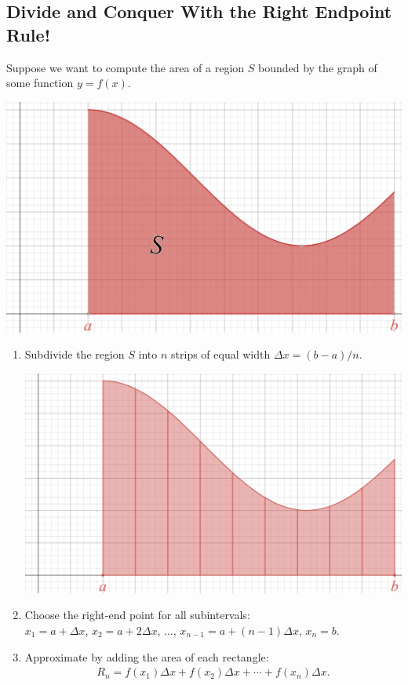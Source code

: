 \documentclass[12pt,a4paper]{article}
\begin{document}
	\newpage
	
	\subsection{Divide and Conquer With the Right Endpoint Rule!}
	
	Suppose we want to compute the area of a region $S$ bounded by the graph of some function $y = f(x)$.
	
	\begin{center}
	\includegraphics[scale=0.39]{regionS.png}
	\end{center}
	
	\begin{enumerate}[label=\underline{\textsc{Step} \Roman*}]
	\item Subdivide the region $S$ into $n$ strips of equal width $\Delta x = (b-a)/n$.
		\begin{center}
		\includegraphics[scale=0.365]{regionSDivided}
		\end{center}
		\vspace*{10pt}
	\item Choose the right-end point for all subintervals:\\
		$x_1 = a + \Delta x$, $x_2 = a + 2 \Delta x$, $\ldots$, $x_{n-1} = a + (n - 1) \Delta x$, $x_n = b$.
	\item Approximate by adding the area of each rectangle:
		\begin{align*}
		R_n = f(x_1) \Delta x + f(x_2) \Delta x + \cdots + f(x_n) \Delta x .
		\end{align*}
	\end{enumerate}
	
\end{document}
